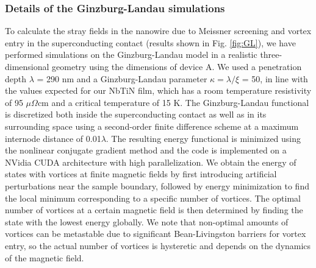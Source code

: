 \subsubsection{Details of the Ginzburg-Landau simulations}
To calculate the stray fields in the nanowire due to Meissner screening and vortex entry in the superconducting contact (results shown in Fig. \ref{fig:GL}), we have performed simulations on the Ginzburg-Landau model \cite{Gropp1996} in a realistic three-dimensional geometry using the dimensions of device A. We used a penetration depth $\lambda$ = 290 nm and a Ginzburg-Landau parameter $\kappa = \lambda / \xi$ = 50, in line with the values expected for our NbTiN film, which has a room temperature resistivity of 95 $\mu \Omega$cm and a critical temperature of 15 K. The Ginzburg-Landau functional is discretized both inside the superconducting contact as well as in its surrounding space \cite{Du1999} using a second-order finite difference scheme at a maximum internode distance of 0.01$\lambda$. The resulting energy functional is minimized using the nonlinear conjugate gradient method and the code is implemented on a NVidia CUDA architecture with high parallelization.
We obtain the energy of states with vortices at finite magnetic fields by first introducing artificial perturbations near the sample boundary, followed by energy minimization to find the local minimum corresponding to a specific number of vortices. The optimal number of vortices at a certain magnetic field is then determined by finding the state with the lowest energy globally. We note that non-optimal amounts of vortices can be metastable due to significant Bean-Livingston barriers for vortex entry, so the actual number of vortices is hysteretic and depends on the dynamics of the magnetic field.

